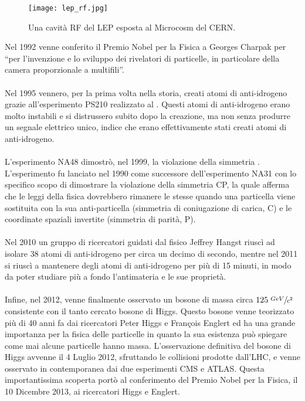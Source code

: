 			\begin{figure}[h!]
				\begin{center}
					\texttt{[image: lep\_rf.jpg]}
				\end{center}
				\caption[Cavità RF del LEP]{Una cavità RF del LEP esposta al Microcosm del CERN.}
				\label{fig:lep_rf}
			\end{figure}
			\noindent
			Nel 1992 venne conferito il Premio Nobel per la Fisica a Georges Charpak per ``per l'invenzione e lo sviluppo dei rivelatori di particelle, in particolare della camera proporzionale a multifili''.\\
			\\
			Nel 1995 vennero, per la prima volta nella storia, creati atomi di anti-idrogeno grazie all'esperimento PS210 realizzato al . Questi atomi di anti-idrogeno erano molto instabili e si distrussero subito dopo la creazione, ma non senza produrre un segnale elettrico unico, indice che erano effettivamente stati creati atomi di anti-idrogeno.\\
			\\
			L'esperimento NA48 dimostrò, nel 1999, la violazione della simmetria . L'esperimento fu lanciato nel 1990 come successore dell'esperimento NA31 con lo specifico scopo di dimostrare la violazione della simmetria \ac{CP}, la quale afferma che le leggi della fisica dovrebbero rimanere le stesse quando una particella viene sostituita con la sua anti-particella (simmetria di coniugazione di carica, C) e le coordinate spaziali invertite (simmetria di parità, P).\\
			\\
			Nel 2010 un gruppo di ricercatori guidati dal fisico Jeffrey Hangst riuscì ad isolare 38 atomi di anti-idrogeno per circa un decimo di secondo, mentre nel 2011 si riuscì a mantenere degli atomi di anti-idrogeno per più di 15 minuti, in modo da poter studiare più a fondo l'antimateria e le sue proprietà.\\
			\\
			Infine, nel 2012, venne finalmente osservato un bosone di massa circa $125 \; \sfrac{GeV}{c^2}$ consistente con il tanto cercato bosone di Higgs. Questo bosone venne teorizzato più di 40 anni fa dai ricercatori Peter Higgs e François Englert ed ha una grande importanza per la fisica delle particelle in quanto la sua esistenza può spiegare come mai alcune particelle hanno massa. L'osservazione definitiva del bosone di Higgs avvenne il 4 Luglio 2012, sfruttando le collisioni prodotte dall'\ac{LHC}, e venne osservato in contemporanea dai due esperimenti \ac{CMS} e \ac{ATLAS}. Questa importantissima scoperta portò al conferimento del Premio Nobel per la Fisica, il 10 Dicembre 2013, ai ricercatori Higgs e Englert.
			
